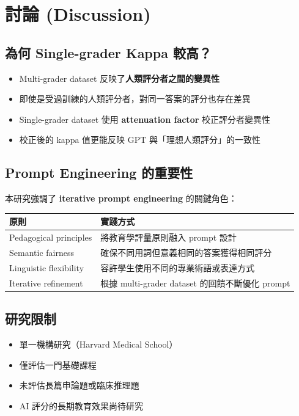 \documentclass[12pt,a4paper]{article}
\begin{document}
\section{討論 (Discussion)}

\subsection{為何 Single-grader Kappa 較高？}

\begin{itemize}[leftmargin=2em]
    \item Multi-grader dataset 反映了\textbf{人類評分者之間的變異性}
    \item 即使是受過訓練的人類評分者，對同一答案的評分也存在差異
    \item Single-grader dataset 使用 \textbf{attenuation factor} 校正評分者變異性
    \item 校正後的 kappa 值更能反映 GPT 與「理想人類評分」的一致性
\end{itemize}

\subsection{Prompt Engineering 的重要性}

本研究強調了 \textbf{iterative prompt engineering} 的關鍵角色：

\begin{longtable}{p{4cm}p{10cm}}
\toprule
\textbf{原則} & \textbf{實踐方式} \\
\midrule
\endfirsthead
Pedagogical principles & 將教育學評量原則融入 prompt 設計 \\
\midrule
Semantic fairness & 確保不同用詞但意義相同的答案獲得相同評分 \\
\midrule
Linguistic flexibility & 容許學生使用不同的專業術語或表達方式 \\
\midrule
Iterative refinement & 根據 multi-grader dataset 的回饋不斷優化 prompt \\
\bottomrule
\end{longtable}

\subsection{研究限制}

\begin{itemize}[leftmargin=2em]
    \item 單一機構研究（Harvard Medical School）
    \item 僅評估一門基礎課程
    \item 未評估長篇申論題或臨床推理題
    \item AI 評分的長期教育效果尚待研究
\end{itemize}
\end{document}
